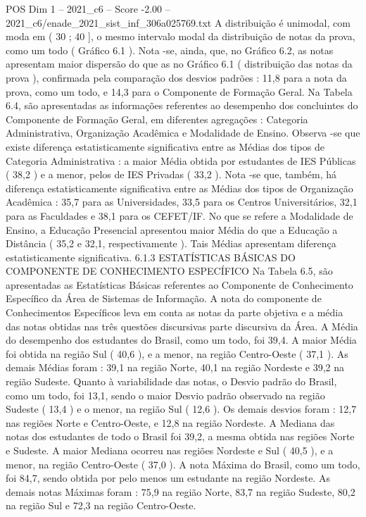 \begin{textsample}{POS Dim 1 – 2021\_c6 – Score -2.00 – 2021\_c6/enade\_2021\_sist\_inf\_306a025769.txt}
A distribuição é unimodal, com moda em ( 30 ; 40 ], o mesmo intervalo modal da distribuição de notas da prova, como um todo ( Gráfico 6.1 ).
Nota -se, ainda, que, no Gráfico 6.2, as notas apresentam maior dispersão do que as no Gráfico 6.1 ( distribuição das notas da prova ), confirmada pela comparação dos desvios padrões : 11,8 para a nota da prova, como um todo, e 14,3 para o Componente de Formação Geral.
Na Tabela 6.4, são apresentadas as informações referentes ao desempenho dos concluintes do Componente de Formação Geral, em diferentes agregações : Categoria Administrativa, Organização Acadêmica e Modalidade de Ensino.
Observa -se que existe diferença estatisticamente significativa entre as Médias dos tipos de Categoria Administrativa : a maior Média obtida por estudantes de IES Públicas ( 38,2 ) e a menor, pelos de IES Privadas ( 33,2 ).
Nota -se que, também, há diferença estatisticamente significativa entre as Médias dos tipos de Organização Acadêmica : 35,7 para as Universidades, 33,5 para os Centros Universitários, 32,1 para as Faculdades e 38,1 para os CEFET/IF.
No que se refere a Modalidade de Ensino, a Educação Presencial apresentou maior Média do que a Educação a Distância ( 35,2 e 32,1, respectivamente ).
Tais Médias apresentam diferença estatisticamente significativa. 6.1.3 ESTATÍSTICAS BÁSICAS DO COMPONENTE DE CONHECIMENTO ESPECÍFICO Na Tabela 6.5, são apresentadas as Estatísticas Básicas referentes ao Componente de Conhecimento Específico da Área de Sistemas de Informação.
A nota do componente de Conhecimentos Específicos leva em conta as notas da parte objetiva e a média das notas obtidas nas três questões discursivas parte discursiva da Área.
A Média do desempenho dos estudantes do Brasil, como um todo, foi 39,4.
A maior Média foi obtida na região Sul ( 40,6 ), e a menor, na região Centro-Oeste ( 37,1 ).
As demais Médias foram : 39,1 na região Norte, 40,1 na região Nordeste e 39,2 na região Sudeste.
Quanto à variabilidade das notas, o Desvio padrão do Brasil, como um todo, foi 13,1, sendo o maior Desvio padrão observado na região Sudeste ( 13,4 ) e o menor, na região Sul ( 12,6 ).
Os demais desvios foram : 12,7 nas regiões Norte e Centro-Oeste, e 12,8 na região Nordeste.
A Mediana das notas dos estudantes de todo o Brasil foi 39,2, a mesma obtida nas regiões Norte e Sudeste.
A maior Mediana ocorreu nas regiões Nordeste e Sul ( 40,5 ), e a menor, na região Centro-Oeste ( 37,0 ).
A nota Máxima do Brasil, como um todo, foi 84,7, sendo obtida por pelo menos um estudante na região Nordeste.
As demais notas Máximas foram : 75,9 na região Norte, 83,7 na região Sudeste, 80,2 na região Sul e 72,3 na região Centro-Oeste.

\end{textsample}
